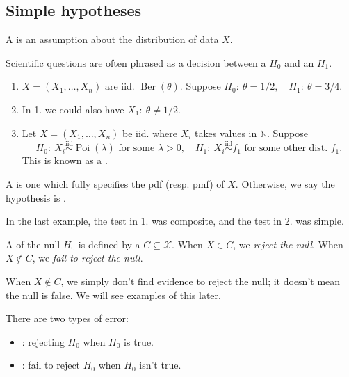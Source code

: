 \documentclass[egregdoesnotlikesansseriftitles,a4paper]{scrartcl}
\begin{document}
\subsection{Simple hypotheses}
\begin{definition*}[Hypothesis]
      A  is an assumption about the distribution of data $X$.
\end{definition*}
Scientific questions are often phrased as a decision between a  $H_0 $ and an  $H_1 $. 
\begin{example*}
      \begin{enumerate}
           \item $X = (X_1 ,\ldots,X_n)$ are iid. $\operatorname{Ber}(\theta )$. Suppose $H_0: \ \theta =1/2, \quad H_1 : \ \theta =3/4$.
           \item In 1. we could also have $X_1 :\ \theta \neq 1/2$.
           \item Let $X = (X_1 ,\ldots,X_n)$ be iid. where $X_i$ takes values in $\mathbb{N}$. Suppose \[
           H_0 : \ X_{i} \overset{\operatorname{iid}}{\sim} \operatorname{Poi}(\lambda ) \text{ for some } \lambda >0, \quad H_1 : \ X_{i} \overset{\operatorname{iid}}{\sim} f_{1} \text{ for some other dist. } f_{1}
           .\] This is known as a .
      \end{enumerate}
\end{example*}
\begin{definition*}
      A  is one which fully specifies the pdf (resp. pmf) of $X$. Otherwise, we say the hypothesis is .
\end{definition*}
In the last example, the test in 1. was composite, and the test in 2. was simple.
\begin{definition*}[Test]
      A  of the null $H_0 $ is defined by a  $C \subseteq \mathcal{X}$. When $X \in C$, we \emph{reject the null}. When $X \notin C$, we \emph{fail to reject the null}.
      \begin{remark}
            When $X \notin C$, we simply don't find evidence to reject the null; it doesn't mean the null is false. We will see examples of this later.
      \end{remark}
\end{definition*}
\begin{definition*}[Error]
     There are two types of error:
     \begin{itemize}
          \item {}: rejecting $H_0 $ when $H_0 $ is true.
          \item {}: fail to reject $H_0 $ when $H_0 $ isn't true.
     \end{itemize}
\end{definition*}
\end{document}

